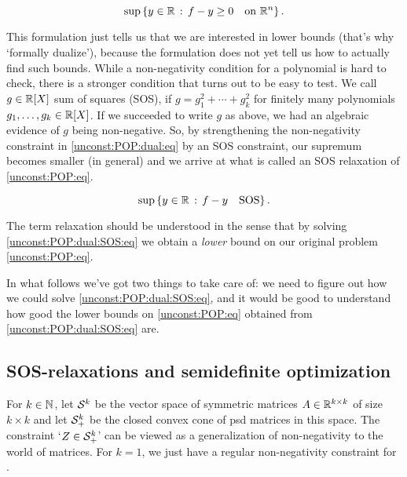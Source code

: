 \begin{equation}
	\sup \left\{ y \in \mathbb{R} \,:\,  f - y \ge 0 \quad \text{on} \ \mathbb{R}^n \right\}. \label{unconst:POP:dual:eq}
\end{equation}

This formulation just tells us that we are interested in lower bounds (that's why `formally dualize'), because the formulation does not yet tell us how to actually find such bounds. While a non-negativity condition for a polynomial is hard to check, there is a stronger condition that turns out to be easy to test. We call $g \in \mathbb{R}[X]$ sum of squares (SOS), if $g= g_1^2 + \cdots + g_k^2$ for finitely many polynomials $g_1,\ldots,g_k \in \mathbb{R}[X]$. If we succeeded to write $g$ as above, we had an algebraic evidence of $g$ being non-negative. So, by strengthening the non-negativity constraint in \eqref{unconst:POP:dual:eq} by an SOS constraint, our supremum becomes smaller (in general) and we arrive at what is called an SOS relaxation of \eqref{unconst:POP:eq}. 

\begin{equation}
\sup \left\{ y \in \mathbb{R} \,:\,  f - y \quad \text{SOS} \right\}. \label{unconst:POP:dual:SOS:eq}
\end{equation}

The term relaxation should be understood in the sense that by solving \eqref{unconst:POP:dual:SOS:eq} we obtain a \emph{lower} bound on our original problem \eqref{unconst:POP:eq}. 

In what follows we've got two things to take care of: we need to figure out how we could solve  \eqref{unconst:POP:dual:SOS:eq}, and it would be good to understand how good the lower bounds on \eqref{unconst:POP:eq} obtained from \eqref{unconst:POP:dual:SOS:eq} are.


\subsection{SOS-relaxations and semidefinite optimization}

\label{SOS:and:sdp}

For $k \in \mathbb{N}$, let $\mathcal{S}^k$ be the vector space of symmetric matrices $A \in \mathbb{R}^{k \times k}$ of size $k \times k$ and let $\mathcal{S}_+^k$ be the closed convex cone of psd matrices in this space. The constraint `$Z \in \mathcal{S}_+^k$' can be viewed as a generalization of non-negativity to the world of matrices. For $k=1$, we just have a regular non-negativity constraint for .

